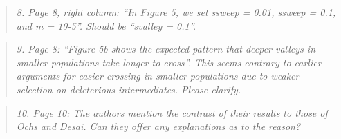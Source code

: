 \documentclass[11pt]{article}
\newenvironment{reviewerquote}{\begin{quote}\color{black}\itshape}{\end{quote}}
\begin{document}
\begin{reviewerquote}
8. Page 8, right column: “In Figure 5, we set ssweep = 0.01, ssweep = 0.1, and m = 10-5”. Should be “svalley = 0.1”.
\end{reviewerquote}

\begin{reviewerquote}
9. Page 8: “Figure 5b shows the expected pattern that deeper valleys in smaller populations take longer to cross”. This seems contrary to earlier arguments for easier crossing in smaller populations due to weaker selection on deleterious intermediates. Please clarify.
\end{reviewerquote}

\begin{reviewerquote}
10. Page 10: The authors mention the contrast of their results to those of Ochs and Desai. Can they offer any explanations as to the reason?
\end{reviewerquote}
\end{document}
